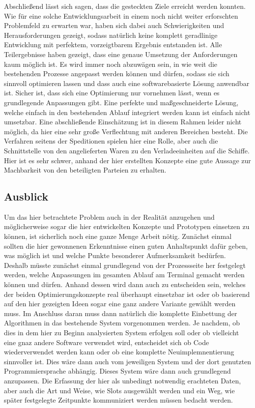 Abschließend lässt sich sagen, dass die gesteckten Ziele erreicht werden konnten. Wie für eine solche Entwicklungsarbeit in einem noch nicht weiter erforschten Problemfeld zu erwarten war, haben sich dabei auch Schwierigkeiten und Herausforderungen gezeigt, sodass natürlich keine komplett geradlinige Entwicklung mit perfektem, vorzeigtbarem Ergebnis entstanden ist. Alle Teilergebnisse haben gezeigt, dass eine genaue Umsetzung der Anforderungen kaum möglich ist. Es wird immer noch abzuwägen sein, in wie weit die bestehenden Prozesse angepasst werden können und dürfen, sodass sie sich sinnvoll optimieren lassen und dass auch eine softwarebasierte Lösung anwendbar ist. Sicher ist, dass sich eine Optimierung nur vornehmen lässt, wenn es grundlegende Anpassungen gibt. Eine perfekte und maßgeschneiderte Lösung, welche einfach in den bestehenden Ablauf integriert werden kann ist einfach nicht umsetzbar. Eine abschließende Einschätzung ist in diesem Rahmen leider nicht möglich, da hier eine sehr große Verflechtung mit anderen Bereichen besteht. Die Verfahren seitens der Speditionen spielen hier eine Rolle, aber auch die Schnittstelle von den angelieferten Waren zu den Verladeeinheiten auf die Schiffe. Hier ist es sehr schwer, anhand der hier erstellten Konzepte eine gute Aussage zur Machbarkeit von den beteiligten Parteien zu erhalten.



\subsection{Ausblick}

Um das hier betrachtete Problem auch in der Realität anzugehen und möglicherweise sogar die hier entwickelten Konzepte und Prototypen einsetzen zu können, ist sicherlich noch eine ganze Menge Arbeit nötig. Zunächst einmal sollten die hier gewonnenen Erkenntnisse einen guten Anhaltspunkt dafür geben, was möglich ist und welche Punkte besonderer Aufmerksamkeit bedürfen. Deshalb müsste zunächst einmal grundlegend von der Prozessseite her festgelegt werden, welche Anpassungen im gesamten Ablauf am Terminal gemacht werden können und dürfen. Anhand dessen wird dann auch zu entscheiden sein, welches der beiden Optimierungskonzepte real überhaupt einsetzbar ist oder ob basierend auf den hier gezeigten Ideen sogar eine ganz andere Variante gewählt werden muss. Im Anschluss daran muss dann natürlich die komplette Einbettung der Algorithmen in das bestehende System vorgenommen werden. Je nachdem, ob dies in dem hier zu Beginn analysierten System erfolgen soll oder ob vielleicht eine gnaz andere Software verwendet wird, entscheidet sich ob Code wiederverwendet werden kann oder ob eine komplette Neuimplemnentierung sinnvoller ist. Dies wäre dann auch vom jeweiligen System und der dort genutzten Programmiersprache abhängig. Dieses System wäre dann auch grundlegend anzupassen. Die Erfassung der hier als unbedingt notwendig erachteten Daten, aber auch die Art und Weise, wie Slots ausgewählt werden und ein Weg, wie später festgelegte Zeitpunkte kommuniziert werden müssen bedacht werden.

